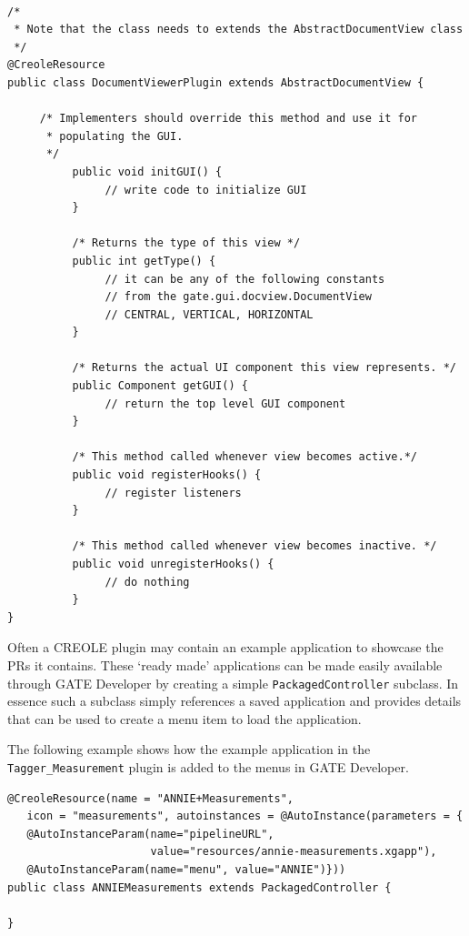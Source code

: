 \begin{lstlisting}

/*
 * Note that the class needs to extends the AbstractDocumentView class
 */
@CreoleResource
public class DocumentViewerPlugin extends AbstractDocumentView {

     /* Implementers should override this method and use it for
      * populating the GUI.
      */
          public void initGUI() {
               // write code to initialize GUI   
          }

          /* Returns the type of this view */
          public int getType() {
               // it can be any of the following constants 
               // from the gate.gui.docview.DocumentView
               // CENTRAL, VERTICAL, HORIZONTAL
          }

          /* Returns the actual UI component this view represents. */
          public Component getGUI() {
               // return the top level GUI component 
          }

          /* This method called whenever view becomes active.*/
          public void registerHooks() {
               // register listeners
          }

          /* This method called whenever view becomes inactive. */
          public void unregisterHooks() {
               // do nothing
          }
}
\end{lstlisting}


Often a CREOLE plugin may contain an example application to showcase the
PRs it contains. These `ready made' applications can be made easily available
through GATE Developer by creating a simple {\tt PackagedController} subclass.
In essence such a subclass simply references a saved application and provides
details that can be used to create a menu item to load the application.

The following example shows how the example application in the
{\tt Tagger\_Measurement} plugin is added to the menus in GATE Developer.

\begin{lstlisting}
@CreoleResource(name = "ANNIE+Measurements",
   icon = "measurements", autoinstances = @AutoInstance(parameters = {
   @AutoInstanceParam(name="pipelineURL",
                      value="resources/annie-measurements.xgapp"),
   @AutoInstanceParam(name="menu", value="ANNIE")}))
public class ANNIEMeasurements extends PackagedController {

}
\end{lstlisting}

